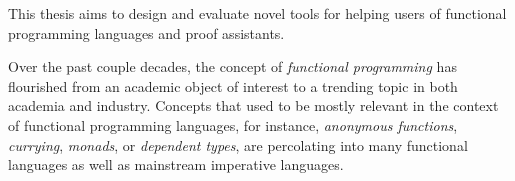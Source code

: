 This thesis aims to design and evaluate novel tools for helping users of
functional programming languages and proof assistants.

Over the past couple decades, the concept of \emph{functional programming} has
flourished from an academic object of interest to a trending topic in both
academia and industry.  Concepts that used to be mostly relevant in the context
of functional programming languages, for instance, \emph{anonymous functions},
\emph{currying}, \emph{monads}, or \emph{dependent types}, are percolating into
many functional languages as well as mainstream imperative languages.

